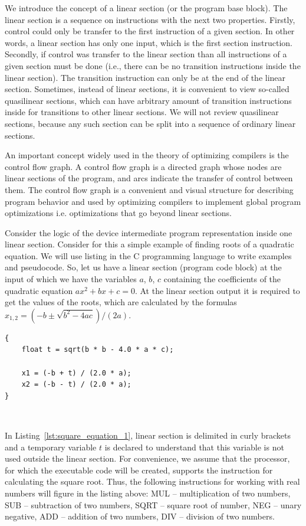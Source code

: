 \documentclass[
11pt,%
tightenlines,%
twoside,%
onecolumn,%
nofloats,%
nobibnotes,%
nofootinbib,%
superscriptaddress,%
noshowpacs,%
centertags]%
{revtex4}
\begin{document}
We introduce the concept of a linear section (or the program base block). The linear section is a sequence on instructions with the next two properties. Firstly, control could only be transfer to the first instruction of a given section. In other words, a linear section has only one input, which is the first section instruction. Secondly, if control was transfer to the linear section than all instructions of a given section must be done (i.e., there can be no transition instructions inside the linear section). The transition instruction can only be at the end of the linear section. Sometimes, instead of linear sections, it is convenient to view so-called quasilinear sections, which can have arbitrary amount of transition instructions inside for transitions to other linear sections. We will not review quasilinear sections, because any such section can be split into a sequence of ordinary linear sections.

An important concept widely used in the theory of optimizing compilers is the control flow graph. A control flow graph is a directed graph whose nodes are linear sections of the program, and arcs indicate the transfer of control between them. The control flow graph is a convenient and visual structure for describing program behavior and used by optimizing compilers to implement global program optimizations i.e. optimizations that go beyond linear sections.

Consider the logic of the device intermediate program representation inside one linear section. Consider for this a simple example of finding roots of a quadratic equation. We will use listing in the C programming language to write examples and pseudocode. So, let us have a linear section (program code block) at the input of which we have the variables $a$, $b$, $c$ containing the coefficients of the quadratic equation $ax^2 + bx + c = 0$. At the linear section output it is required to get the values of the roots, which are calculated by the formulas $x_{1,2} = (-b \pm \sqrt{b^2 - 4ac})/(2a)$.

\begin{lstlisting}[caption={The code block for calculating the roots of the quadratic equation.},label={lst:square_equation_1}]
{
    float t = sqrt(b * b - 4.0 * a * c);
    
    x1 = (-b + t) / (2.0 * a);
    x2 = (-b - t) / (2.0 * a);
}
\end{lstlisting}

\

In Listing~\ref{lst:square_equation_1}, linear section is delimited in curly brackets and a temporary variable $t$ is declared to understand that this variable is not used outside the linear section. For convenience, we assume that the processor, for which the executable code will be created, supports the instruction for calculating the square root. Thus, the following instructions for working with real numbers will figure in the listing above: MUL -- multiplication of two numbers, SUB -- subtraction of two numbers, SQRT -- square root of number, NEG -- unary negative, ADD -- addition of two numbers, DIV -- division of two numbers.
\end{document}
